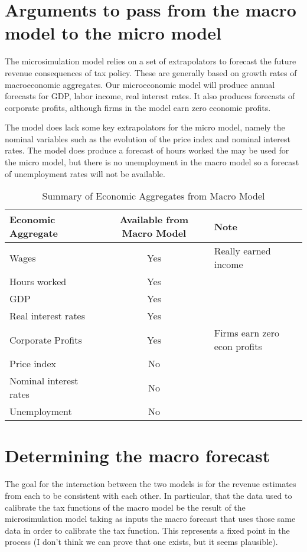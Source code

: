 \documentclass[letterpaper,11pt]{article}
\theoremstyle{definition}
\begin{document}
\section{Arguments to pass from the macro model to the micro model}

The microsimulation model relies on a set of extrapolators to forecast the future revenue consequences of tax policy.  These are generally based on growth rates of macroeconomic aggregates.  Our microeconomic model will produce annual forecasts for GDP, labor income, real interest rates.  It also produces forecasts of corporate profits, although firms in the model earn zero economic profits.

The model does lack some key extrapolators for the micro model, namely the nominal variables such as the evolution of the price index and nominal interest rates.  The model does produce a forecast of hours worked the may be used for the micro model, but there is no unemployment in the macro model so a forecast of unemployment rates will not be available.


\begin{table}[htbp]
  \centering
  \caption{Summary of Economic Aggregates from Macro Model}
    \begin{tabular}{lcl}
    \hline
    \hline
    Economic Aggregate & Available from Macro Model & Note \\
    \hline
    Wages & Yes   & Really earned income \\
    Hours worked & Yes   &  \\
    GDP   & Yes   &  \\
    Real interest rates & Yes   &  \\
    Corporate Profits & Yes   & Firms earn zero econ profits \\
    Price index & No    &  \\
    Nominal interest rates & No    &  \\
    Unemployment & No    &  \\
   \hline
   \hline
    \end{tabular}%
  \label{tab:macro_vars}%
\end{table}%


\section{Determining the macro forecast}

The goal for the interaction between the two models is for the revenue estimates from each to be consistent with each other.  In particular, that the data used to calibrate the tax functions of the macro model be the result of the microsimulation model taking as inputs the macro forecast that uses those same data in order to calibrate the tax function.  This represents a fixed point in the process (I don't think we can prove that one exists, but it seems plausible).
\end{document}
